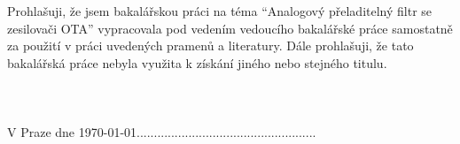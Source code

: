 \vspace{18cm}

Prohlašuji, že jsem bakalářskou práci na téma \enquote{Analogový přeladitelný filtr se zesilovači OTA} vypracovala pod vedením vedoucího bakalářské práce samostatně za použití v práci uvedených pramenů a literatury. Dále prohlašuji, že tato bakalářská práce nebyla využita k získání jiného nebo stejného titulu.\\
\\
\\
\\
V Praze dne \today \hfill \hfill ....................................................
